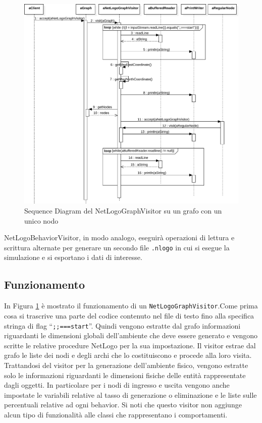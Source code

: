 \begin{figure}[htbp]
\centering
\includegraphics[width=\textwidth,height=\textheight,keepaspectratio]{images/visitor-sequence.pdf}
\caption{Sequence Diagram del NetLogoGraphVisitor su un grafo con un unico nodo}
\label{fig:visitor-sequence}
\end{figure}
NetLogoBehaviorVisitor, in modo analogo, eseguirà operazioni di lettura e scrittura alternate per generare un secondo file \texttt{.nlogo} in cui si esegue la simulazione e si esportano i dati di interesse.

\subsection{Funzionamento}

In Figura \ref{fig:visitor-sequence} è mostrato il funzionamento di un \texttt{NetLogoGraphVisitor}.Come prima cosa si trascrive una parte del codice contenuto nel file di testo fino alla specifica stringa di flag “\texttt{;;===start}”. Quindi vengono estratte dal grafo informazioni riguardanti le dimensioni globali dell'ambiente che deve essere generato e vengono scritte le relative procedure NetLogo per la sua impostazione. Il visitor estrae dal grafo le liste dei nodi e degli archi che lo costituiscono e procede alla loro visita. Trattandosi del visitor per la generazione dell'ambiente fisico, vengono estratte solo le informazioni riguardanti le dimensioni fisiche delle entità rappresentate dagli oggetti. In particolare per i nodi di ingresso e uscita vengono anche impostate le variabili relative al tasso di generazione o eliminazione e le liste sulle percentuali relative ad ogni behavior. Si noti che questo visitor non aggiunge alcun tipo di funzionalità alle classi che rappresentano i comportamenti.


